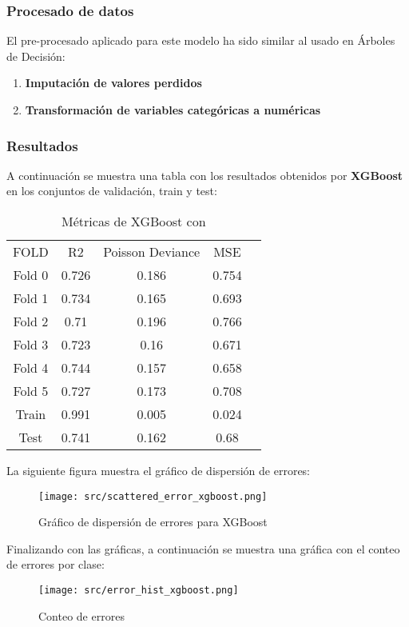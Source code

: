 \subsubsection*{Procesado de datos}
El pre-procesado aplicado para este modelo ha sido similar al usado en Árboles de Decisión:
\begin{enumerate}
	\item \textbf{Imputación de valores perdidos}
	\item \textbf{Transformación de variables categóricas a numéricas}
\end{enumerate}
\subsubsection*{Resultados}
A continuación se muestra una tabla con los resultados obtenidos por \textbf{XGBoost} en los conjuntos de validación, train y test:
\begin{table}[H]
	\centering
	\begin{tabular}{|c|c|c|c|c|}
		\cline{1-4}
		FOLD   & R2    & Poisson Deviance & MSE   \\ \cline{1-4}
		Fold 0 & 0.726 & 0.186            & 0.754 \\ \cline{1-4}
		Fold 1 & 0.734 & 0.165            & 0.693 \\ \cline{1-4}
		Fold 2 & 0.71  & 0.196            & 0.766 \\ \cline{1-4}
		Fold 3 & 0.723 & 0.16             & 0.671 \\ \cline{1-4}
		Fold 4 & 0.744 & 0.157            & 0.658 \\ \cline{1-4}
		Fold 5 & 0.727 & 0.173            & 0.708 \\ \cline{1-4}
		Train  & 0.991 & 0.005            & 0.024 \\ \cline{1-4}
		Test   & 0.741 & 0.162            & 0.68  \\ \cline{1-4}
	\end{tabular}
	\caption{Métricas de XGBoost con}
	\label{tab:xgboost}
\end{table}
La siguiente figura muestra el gráfico de dispersión de errores:
\begin{figure}[H]
	\centering
	\texttt{[image: src/scattered\_error\_xgboost.png]}
	\caption{Gráfico de dispersión de errores para XGBoost}
	\label{fig:xgboost_scattered}
\end{figure}
Finalizando con las gráficas, a continuación se muestra una gráfica con el conteo de errores por clase:
\begin{figure}[H]
	\centering
	\texttt{[image: src/error\_hist\_xgboost.png]}
	\caption{Conteo de errores}
	\label{fig:xgboost_error_plot}
\end{figure}
